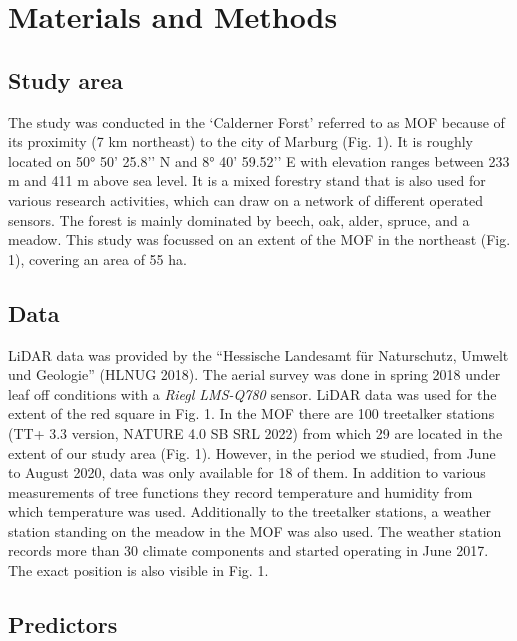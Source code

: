 \documentclass[5p]{elsarticle} %
\begin{document}
\hypertarget{materials-and-methods}{%
\section{Materials and Methods}\label{materials-and-methods}}

\hypertarget{study-area}{%
\subsection{\texorpdfstring{Study area\\
}{Study area }}\label{study-area}}

The study was conducted in the ‘Calderner Forst’ referred to as MOF because of its proximity (7 km northeast) to the city of Marburg (Fig. 1). It is roughly located on 50° 50’ 25.8’’ N and 8° 40’ 59.52’’ E with elevation ranges between 233 m and 411 m above sea level. It is a mixed forestry stand that is also used for various research activities, which can draw on a network of different operated sensors. The forest is mainly dominated by beech, oak, alder, spruce, and a meadow. This study was focussed on an extent of the MOF in the northeast (Fig. 1), covering an area of 55 ha.


\hypertarget{data}{%
\subsection{\texorpdfstring{Data\\
}{Data }}\label{data}}

LiDAR data was provided by the “Hessische Landesamt für Naturschutz, Umwelt und Geologie” (HLNUG 2018). The aerial survey was done in spring 2018 under leaf off conditions with a \emph{Riegl LMS-Q780} sensor. LiDAR data was used for the extent of the red square in Fig. 1. In the MOF there are 100 treetalker stations (TT+ 3.3 version, NATURE 4.0 SB SRL 2022) from which 29 are located in the extent of our study area (Fig. 1). However, in the period we studied, from June to August 2020, data was only available for 18 of them. In addition to various measurements of tree functions they record temperature and humidity from which temperature was used. Additionally to the treetalker stations, a weather station standing on the meadow in the MOF was also used. The weather station records more than 30 climate components and started operating in June 2017. The exact position is also visible in Fig. 1.


\hypertarget{predictors}{%
\subsection{\texorpdfstring{Predictors\\
}{Predictors }}\label{Predictors}}
\end{document}

